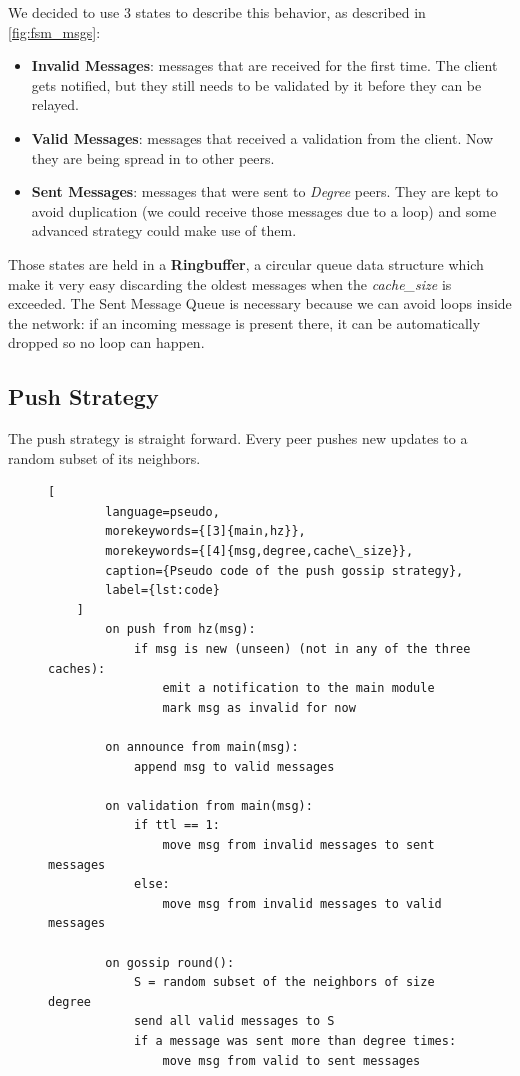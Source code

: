 \documentclass[a4paper,english,10pt,NET]{tumarticle}
\begin{document}
We decided to use 3 states to describe this behavior, as described in \cref{fig:fsm_msgs}: 

\begin{itemize}
	\item \textbf{Invalid Messages}: messages that are received for the first time. The client gets notified, but they still needs to be validated by it before they can be relayed. 
	\item \textbf{Valid Messages}: messages that received a validation from the client. Now they are being spread in to other peers.
	\item \textbf{Sent Messages}: messages that were sent to \textit{Degree} peers. They are kept to avoid duplication (we could receive those messages due to a loop) and some advanced strategy could make use of them.
\end{itemize}

Those states are held in a \textbf{Ringbuffer}, a circular queue data structure which make it very easy discarding the oldest messages when the \textit{cache\_size} is exceeded. The Sent Message Queue is necessary because we can avoid loops inside the network: if an incoming message is present there, it can be automatically dropped so no loop can happen.

\subsection{Push Strategy}
The push strategy is straight forward.
Every peer pushes new updates to a random subset of its neighbors. 

\begin{figure}
	\centering
\begin{minipage}{0.50\linewidth}
	\begin{lstlisting}[
		language=pseudo,
		morekeywords={[3]{main,hz}},
		morekeywords={[4]{msg,degree,cache\_size}},
		caption={Pseudo code of the push gossip strategy},
		label={lst:code}
	]
		on push from hz(msg):
			if msg is new (unseen) (not in any of the three caches):
				emit a notification to the main module
				mark msg as invalid for now

		on announce from main(msg):
			append msg to valid messages

		on validation from main(msg):
			if ttl == 1:
				move msg from invalid messages to sent messages
			else:
				move msg from invalid messages to valid messages

		on gossip round():
			S = random subset of the neighbors of size degree
			send all valid messages to S
			if a message was sent more than degree times:
				move msg from valid to sent messages
	\end{lstlisting}
\end{minipage}
\end{figure}
\end{document}
